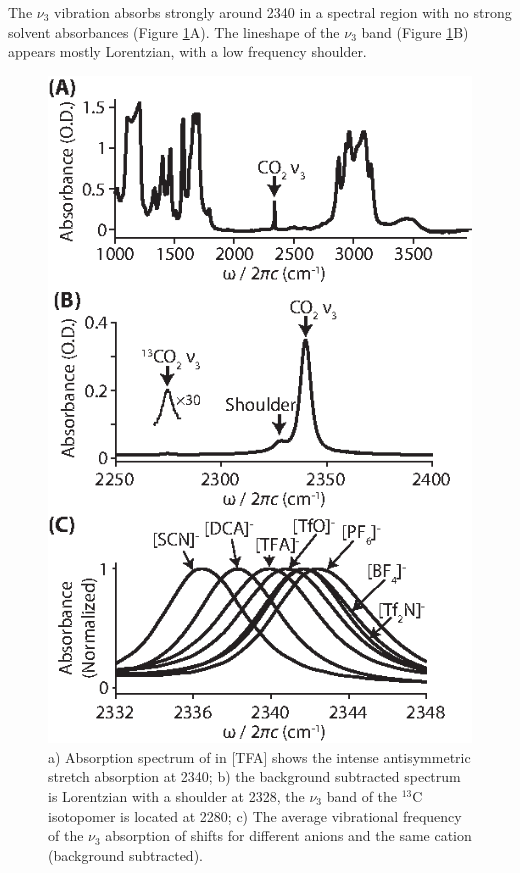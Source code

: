 {The $\nu_3$ vibration absorbs strongly around \SI{2340}{\wavenumber} in a spectral region with no
strong solvent absorbances (Figure \ref{fig:FTIR}A). The lineshape of the $\nu_3$ band (Figure \ref{fig:FTIR}B) appears mostly Lorentzian, with a low frequency shoulder. 
\begin{figure}
	\includegraphics[scale=1]{./anions/fig2.eps}
	\caption[FTIR of carbon dioxide in ionic liquids]{\label{fig:FTIR} a) Absorption spectrum of  in \ce{[Im_{4,1}]}[TFA] shows the intense antisymmetric stretch absorption at \SI{2340}{\wavenumber}; b) the background subtracted spectrum is Lorentzian with a shoulder at \SI{2328}{\wavenumber}, the $\nu_3$ band of the $^{13}$C isotopomer is located at \SI{2280}{\wavenumber}; c) The average vibrational frequency of the $\nu_3$ absorption of  shifts for different anions and the same \ce{[Im_{4,1}^+]} cation (background subtracted).}
\end{figure}

}
